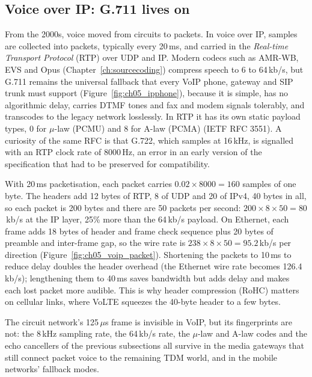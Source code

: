 \subsection{Voice over IP: G.711 lives on}

From the 2000s, voice moved from circuits to packets. In voice over IP, samples are collected
into packets, typically every 20\,ms, and carried in the \emph{Real-time Transport Protocol}
(RTP) over UDP and IP. Modern codecs such as AMR-WB, EVS and Opus (Chapter~\ref{ch:sourcecoding})
compress speech to 6 to 64\,kb/s, but G.711 remains the universal fallback that every VoIP phone,
gateway and SIP trunk must support (Figure~\ref{fig:ch05_ipphone}), because it is simple, has no
algorithmic delay, carries DTMF tones and fax and modem signals tolerably, and transcodes to the
legacy network losslessly. In RTP it has its own static payload types, 0 for $\mu$-law (PCMU) and
8 for A-law (PCMA) (IETF RFC 3551). A curiosity of the same RFC is that G.722, which samples at
16\,kHz, is signalled with an RTP clock rate of 8000\,Hz, an error in an early version of the
specification that had to be preserved for compatibility.

\begin{worked}
With 20\,ms packetisation, each packet carries $0.02\times8000=160$ samples of one byte. The
headers add 12 bytes of RTP, 8 of UDP and 20 of IPv4, 40 bytes in all, so each packet is 200 bytes
and there are 50 packets per second: $200\times8\times50=80$\,kb/s at the IP layer, 25\% more than
the 64\,kb/s payload. On Ethernet, each frame adds 18 bytes of header and frame check sequence plus
20 bytes of preamble and inter-frame gap, so the wire rate is $238\times8\times50=95.2$\,kb/s per
direction (Figure~\ref{fig:ch05_voip_packet}). Shortening the packets to 10\,ms to reduce delay
doubles the header overhead (the Ethernet wire rate becomes 126.4\,kb/s); lengthening them to 40\,ms
saves bandwidth but adds delay and makes each lost packet more audible. This is why header
compression (RoHC) matters on cellular links, where VoLTE squeezes the 40-byte header to a few bytes.
\end{worked}


The circuit network's 125\,$\mu$s frame is invisible in VoIP, but its fingerprints are not: the
8\,kHz sampling rate, the 64\,kb/s rate, the $\mu$-law and A-law codes and the echo cancellers of the
previous subsections all survive in the media gateways that still connect packet voice to the
remaining TDM world, and in the mobile networks' fallback modes.

